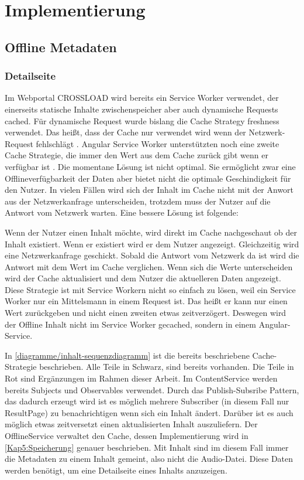 \chapter{Implementierung}
\label{Kap5}

\section{Offline Metadaten}

\subsection{Detailseite}
Im Webportal CROSSLOAD wird bereits ein Service Worker verwendet, der einerseits statische Inhalte zwischenspeicher aber auch dynamische Requests cached. Für dynamische Request wurde bislang die Cache Strategy freshness verwendet. Das heißt, dass der Cache nur verwendet wird wenn der Netzwerk-Request fehlschlägt \autocite{angular-service-worker}. Angular Service Worker unterstützten noch eine zweite Cache Strategie, die immer den Wert aus dem Cache zurück gibt wenn er verfügbar ist \autocite{angular-service-worker}. Die momentane Lösung ist nicht optimal. Sie ermöglicht zwar eine Offlineverfügbarkeit der Daten aber bietet nicht die optimale Geschindigkeit für den Nutzer. In vielen Fällen wird sich der Inhalt im Cache nicht mit der Anwort aus der Netzwerkanfrage unterscheiden, trotzdem muss der Nutzer auf die Antwort vom Netzwerk warten. Eine bessere Lösung ist folgende:

Wenn der Nutzer einen Inhalt möchte, wird direkt im Cache nachgeschaut ob der Inhalt existiert. Wenn er existiert wird er dem Nutzer angezeigt. Gleichzeitig wird eine Netzwerkanfrage geschickt. Sobald die Antwort vom Netzwerk da ist wird die Antwort mit dem Wert im Cache verglichen. Wenn sich die Werte unterscheiden wird der Cache aktualisiert und dem Nutzer die aktuelleren Daten angezeigt. Diese Strategie ist mit Service Workern nicht so einfach zu lösen, weil ein Service Worker nur ein Mittelsmann in einem Request ist. Das heißt er kann nur einen Wert zurückgeben und nicht einen zweiten etwas zeitverzögert. Deswegen wird der Offline Inhalt nicht im Service Worker gecached, sondern in einem Angular-Service.


In \autoref{diagramme/inhalt-sequenzdiagramm} ist die bereits beschriebene Cache-Strategie beschrieben. Alle Teile in Schwarz, sind bereits vorhanden. Die Teile in Rot sind Ergänzungen im Rahmen dieser Arbeit. Im ContentService werden bereits Subjects und Observables verwendet. Durch das Publish-Subsribe Pattern, das dadurch erzeugt wird ist es möglich mehrere Subscriber (in diesem Fall nur ResultPage) zu benachrichtigen wenn sich ein Inhalt ändert. Darüber ist es auch möglich etwas zeitversetzt einen aktualisierten Inhalt auszuliefern. Der OfflineService verwaltet den Cache, dessen Implementierung wird in \autoref{Kap5:Speicherung} genauer beschrieben. Mit Inhalt sind im diesem Fall immer die Metadaten zu einem Inhalt gemeint, also nicht die Audio-Datei. Diese Daten werden benötigt, um eine Detailseite eines Inhalts anzuzeigen.

